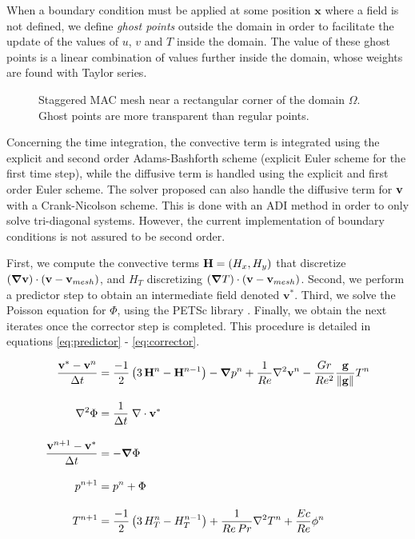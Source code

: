 \documentclass[11 pt]{article}
\begin{document}
When a boundary condition must be applied at some position $\mathbf{x}$ where a field is not defined, we define \textit{ghost points} outside the domain in order to facilitate the update of the values of $u$, $v$ and $T$ inside the domain. The value of these ghost points is a linear combination of values further inside the domain, whose weights are found with Taylor series.

\begin{figure}[H]
    \centering
    
    \caption{Staggered MAC mesh near a rectangular corner of the domain $\Omega$. Ghost points are more transparent than regular points.}
    \label{fig:macMesh}
\end{figure}


Concerning the time integration, the convective term is integrated using the explicit and second order Adams-Bashforth scheme (explicit Euler scheme for the first time step), while the diffusive term is handled using the explicit and first order Euler scheme. The solver proposed can also handle the diffusive term for $\mathbf{v}$ with a Crank-Nicolson scheme. This is done with an ADI method in order to only solve tri-diagonal systems. However, the current implementation of boundary conditions is not assured to be second order.

First, we compute the convective terms $\mathbf{H} = (H_x, H_y)$ that discretize $(\boldsymbol\nabla \mathbf{v}) \cdot (\mathbf{v} - \mathbf{v}_{mesh})$, and $H_T$ discretizing $(\boldsymbol \nabla T) \cdot (\mathbf{v} - \mathbf{v}_{mesh})$. Second, we perform a predictor step to obtain an intermediate field denoted $\mathbf{v}^*$. Third, we solve the Poisson equation for $\Phi$, using the PETSc library \cite{petsc-efficient}. 
Finally, we obtain the next iterates once the corrector step is completed. This procedure is detailed in equations \eqref{eq:predictor} - \eqref{eq:corrector}.

\begin{align}
    \frac{\mathbf{v}^* - \mathbf{v}^n}{\Delta t} &= \frac{-1}{2} \left(3\,\mathbf{H}^n - \mathbf{H}^{n-1}\right) - \boldsymbol{\nabla} p^n + \frac{1}{Re} \nabla^2 \mathbf{v}^n - \frac{Gr}{Re^2} \frac{\mathbf{g}}{\left\|\mathbf{g}\right\|} T^n \label{eq:predictor} \\[10pt]
    \nabla^2\Phi &= \frac{1}{\Delta t} \; \nabla \cdot \mathbf{v}^*\\[10pt]
    \frac{\mathbf{v}^{n+1} - \mathbf{v}^*}{\Delta t} &= -\boldsymbol{\nabla} \Phi\\[10pt]
    p^{n+1} &= p^n + \Phi\\[10pt]
    T^{n+1} &= \frac{-1}{2} \left(3\, H_T^n - H_T^{n-1}\right) + \frac{1}{Re\, Pr} \nabla^2 T^n + \frac{Ec}{Re} \phi^n \label{eq:corrector}
\end{align}
\end{document}
